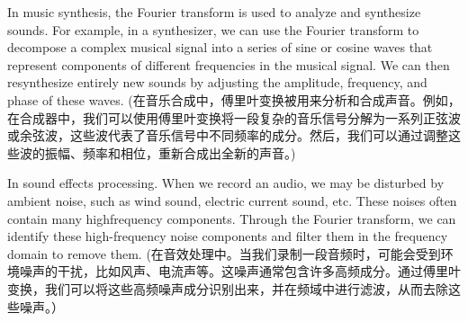 \documentclass[
]{article}
\begin{document}
In music synthesis, the Fourier transform is used to analyze and
synthesize sounds. For example, in a synthesizer, we can use the Fourier
transform to decompose a complex musical signal into a series of sine or
cosine waves that represent components of different frequencies in the
musical signal. We can then resynthesize entirely new sounds by
adjusting the amplitude, frequency, and phase of these waves.
(在音乐合成中，傅里叶变换被用来分析和合成声音。例如，在合成器中，我们可以使用傅里叶变换将一段复杂的音乐信号分解为一系列正弦波或余弦波，这些波代表了音乐信号中不同频率的成分。然后，我们可以通过调整这些波的振幅、频率和相位，重新合成出全新的声音。)

In sound effects processing. When we record an audio, we may be
disturbed by ambient noise, such as wind sound, electric current sound,
etc. These noises often contain many highfrequency components. Through
the Fourier transform, we can identify these high-frequency noise
components and filter them in the frequency domain to remove them.
(在音效处理中。当我们录制一段音频时，可能会受到环境噪声的干扰，比如风声、电流声等。这噪声通常包含许多高频成分。通过傅里叶变换，我们可以将这些高频噪声成分识别出来，并在频域中进行滤波，从而去除这些噪声。）
\end{document}
